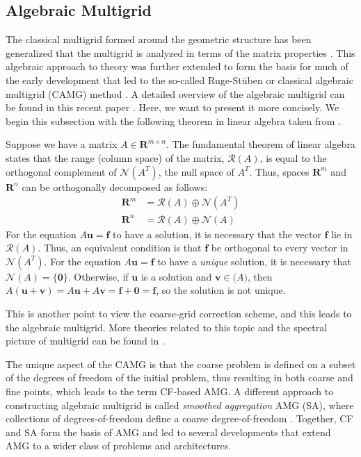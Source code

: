 \subsection{Algebraic Multigrid}
  The classical multigrid formed around the geometric structure has been generalized that the multigrid is analyzed in terms of the matrix properties \citep{mccormick1982multigrid}. This algebraic approach to theory was further extended to form the basis for much of the early development that led to the so-called Ruge-St{\"u}ben or classical algebraic multigrid (CAMG) method \citep{brandt1986algebraic,mandel1988algebraic,ruge1987algebraic}. A detailed overview of the algebraic multigrid can be found in this recent paper \citep{xu2017algebraic}. Here, we want to present it more concisely.
  We begin this subsection with the following theorem in linear algebra taken from \citep{10.5555/357695}.
\begin{theorem}
Suppose we have a matrix $A \in \mathbf{R}^{m\times n}$. The fundamental theorem of linear algebra states that the range (column space) of the matrix, $\mathcal{R}(A)$, is equal to the orthogonal
complement of $\mathcal{N}(A^T)$, the null space of ${A}^{T}$. Thus, spaces $\mathbf{R}^m$ and $\mathbf{R}^n$ can be
orthogonally decomposed as follows:
\begin{align}
    \mathbf{R}^m &= \mathcal{R}(A) \oplus \mathcal{N}(A^T)\\
     \mathbf{R}^n &= \mathcal{R}(A) \oplus \mathcal{N}(A)
\end{align}
For the equation $A\mathbf{u}=\mathbf{f}$ to have a solution, it is necessary that the vector $\mathbf{f}$ lie in $\mathcal{R}(A)$. Thus, an equivalent condition is that $\mathbf{f}$ be orthogonal to every vector in $\mathcal{N}(A^T)$. For the equation $A\mathbf{u}=\mathbf{f}$ to have a \textit{unique} solution, it is necessary that $\mathcal{N}(A) = \{\mathbf{0}\}$. 
Otherwise, if $\mathbf{u}$ is a solution and $\mathbf{v} \in \mathcal(A)$, then $A(\mathbf{u} + \mathbf{v}) = A\mathbf{u} + A\mathbf{v} = \mathbf{f} + \mathbf{0} = \mathbf{f}$, so the solution is not unique.
\end{theorem}
This is another point to view the coarse-grid correction scheme, and this leads to the algebraic multigrid. More theories related to this topic and the spectral picture of multigrid can be found in \citep{10.5555/357695}.

The unique aspect of the CAMG is that the coarse problem is defined on a subset of the degrees of freedom of the initial problem, thus resulting in both coarse and fine points, which leads to the term CF-based AMG. A different approach to constructing algebraic multigrid is called \textit{smoothed aggregation} AMG (SA), where collections of degrees-of-freedom define a coarse degree-of-freedom \citep{vanvek1996algebraic}. Together, CF and SA form the basis of AMG and led to several developments that extend AMG to a wider class of problems and architectures.

